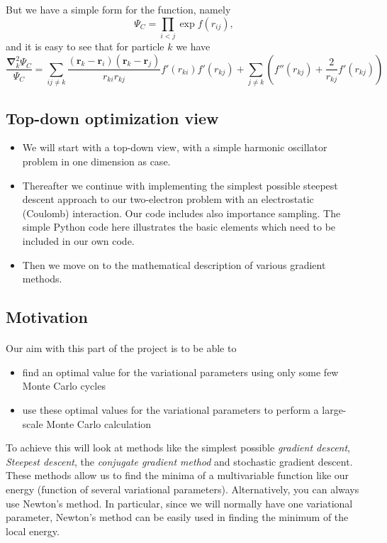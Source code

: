 \documentclass[%
oneside,                 %
final,                   %
10pt]{article}
\begin{document}
But we have a simple form for the function, namely
\[
\Psi_{C}=\prod_{i< j}\exp{f(r_{ij})},
\]
and it is easy to see that for particle  $k$
we have
\[
  \frac{\mathbf{\nabla}^2_k \Psi_C}{\Psi_C }=
\sum_{ij\ne k}\frac{(\mathbf{r}_k-\mathbf{r}_i)(\mathbf{r}_k-\mathbf{r}_j)}{r_{ki}r_{kj}}f'(r_{ki})f'(r_{kj})+
\sum_{j\ne k}\left( f''(r_{kj})+\frac{2}{r_{kj}}f'(r_{kj})\right)
\]

\subsection{Top-down optimization view}

\begin{itemize}
\item We will start with a top-down view, with a simple harmonic oscillator problem in one dimension as case.

\item Thereafter we continue with implementing the simplest possible steepest descent approach to our two-electron problem with an electrostatic (Coulomb) interaction. Our code includes also importance sampling. The simple Python code here illustrates the basic elements which need to be included in our own code.

\item Then we move on to the mathematical description of various gradient methods.
\end{itemize}

\noindent
\subsection{Motivation}

\paragraph{}
Our aim with this part of the project is to be able to
\begin{itemize}
\item find an optimal value for the variational parameters using only some few Monte Carlo cycles

\item use these optimal values for the variational parameters to perform a large-scale Monte Carlo calculation
\end{itemize}

\noindent
To achieve this will look at methods like the simplest possible \emph{gradient descent}, \emph{Steepest descent}, the \emph{conjugate gradient method} and stochastic gradient descent.
These methods allow us to find
the minima of a multivariable  function like our energy (function of several variational parameters). 
Alternatively, you can always use Newton's method. In particular, since we will normally have one variational parameter,
Newton's method can be easily used in finding the minimum of the local energy.
\end{document}
